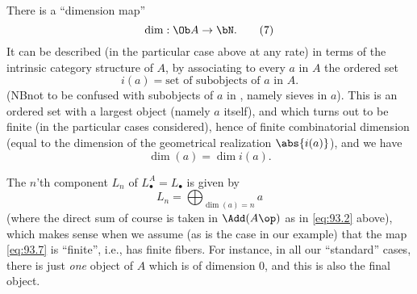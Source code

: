 \enspace
There is a ``dimension map''
\begin{equation}
  \label{eq:93.7}
  \dim:\Ob A\to \bN.\tag{7}
\end{equation}
It can be described (in the particular case above at any rate) in
terms of the intrinsic category structure of $A$, by associating to
every $a$ in $A$ the ordered set
\begin{equation}
  \label{eq:93.8}
  i(a)=\text{set of subobjects of $a$ in $A$.}\tag{8}
\end{equation}
(NB\enspace not to be confused with subobjects of $a$ in \Ahat, namely
sieves in $a$). This is an ordered set with a largest object (namely
$a$ itself), and which turns out to be finite (in the particular cases
considered), hence of finite combinatorial dimension (equal to the
dimension of the geometrical realization $\abs{i(a)}$), and we have
\begin{equation}
  \label{eq:93.9}
  \dim(a)=\dim i(a).\tag{9}
\end{equation}

\enspace
The $n$'th component $L_n$ of $L_\bullet^A=L_\bullet$ is given by
\begin{equation}
  \label{eq:93.10}
  L_n = \bigoplus_{\dim(a)=n} a\tag{10}
\end{equation}
(where the direct sum of course is taken in $\Add(A\op)$ as in
\eqref{eq:93.2} above), which makes sense when we assume (as is the
case in our example) that the map \eqref{eq:93.7} is ``finite'', i.e.,
has finite fibers. For instance, in all our ``standard'' cases, there
is just \emph{one} object of $A$ which is of dimension $0$, and this
is also the final object.

